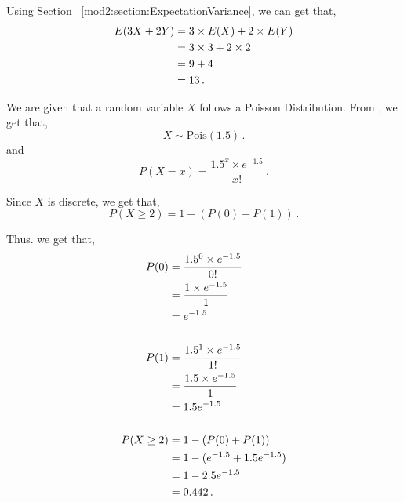 \begin{subquestions}
\begin{subsubquestions}

\subsubquestion

Using Section ~\ref{mod2:section:ExpectationVariance}, we can get that,
\begin{align}
	E(3X+2Y) & = 3\times E(X) + 2\times E(Y) \nonumber \\
	         & = 3 \times 3 + 2 \times 2 \nonumber \\
	         & = 9+4 \nonumber \\
	         & = 13 \,.
\end{align}

\end{subsubquestions}


\subquestion

We are given that a random variable $X$ follows a Poisson Distribution. From , we get that,
\begin{equation}
	X \sim \text{Pois}(1.5) \,.
\end{equation}
and 
\begin{equation}
	P(X = x) =\frac{ 1.5^x \times e^{-1.5}}{x!} \,.
\end{equation}

Since $X$ is discrete, we get that,
\begin{equation}
	P(X \geq 2) = 1 - (P(0)+P(1)) \,.
\end{equation}

Thus. we get that,
\begin{align}
	P(0) & = \frac{ 1.5^0 \times e^{-1.5}}{0!} \nonumber \\
	     & = \frac{ 1 \times e^{-1.5}}{1} \nonumber \\
	     & = e^{-1.5} \\ \nonumber \\
	P(1) & = \frac{ 1.5^1 \times e^{-1.5}}{1!} \nonumber \\
	     & = \frac{1.5 \times e^{-1.5}}{1} \nonumber \\
	     & = 1.5e^{-1.5} \\ \nonumber \\
	P(X \geq 2) & = 1 - (P(0)+P(1)) \nonumber \\
	            & = 1 - (e^{-1.5} + 1.5e^{-1.5}) \nonumber \\
	            & = 1-2.5e^{-1.5} \nonumber \\
	            & = 0.442 \,.
\end{align}

\end{subquestions}